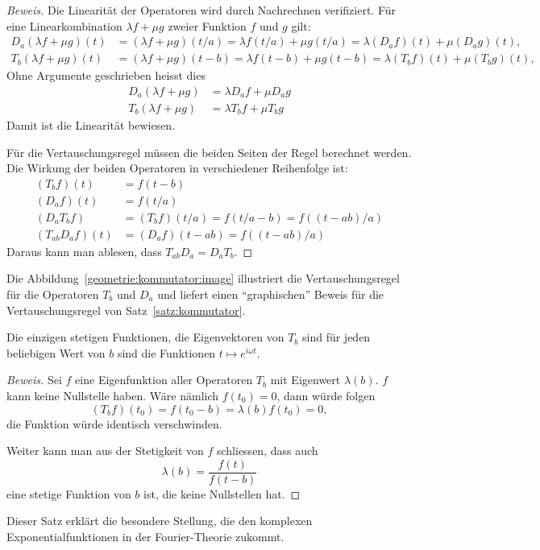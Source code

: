 \begin{proof}[Beweis]
Die Linearität der Operatoren wird durch Nachrechnen verifiziert.
Für eine Linearkombination $\lambda f+\mu g$ zweier Funktion $f$ und $g$ gilt:
\begin{align*}
D_a(\lambda f+\mu g)(t)
&=
(\lambda f+\mu g)(t/a)
=
\lambda f(t/a)+\mu g(t/a)
=
\lambda (D_af)(t)+\mu (D_ag)(t),
\\
T_b(\lambda f+ \mu g)(t)
&=
(\lambda f+\mu g)(t-b)
=
\lambda f(t-b)+\mu g(t-b)
=
\lambda (T_bf)(t)+\mu (T_bg)(t),
\end{align*}
Ohne Argumente geschrieben heisst dies
\begin{align*}
D_a(\lambda f+\mu g) &= \lambda D_af + \mu D_ag
\\
T_b(\lambda f+\mu g) &= \lambda T_bf + \mu T_bg
\end{align*}
Damit ist die Linearität bewiesen.

Für die Vertauschungsregel müssen die beiden Seiten der Regel
berechnet werden.
Die Wirkung der beiden Operatoren in verschiedener Reihenfolge
ist:
\begin{align*}
(T_bf)(t)
&=
f(t-b)
\\
(D_af)(t)
&=
f(t/a)
\\
(D_aT_bf)
&=
(T_bf)(t/a)
=
f(t/a-b)
=
f((t-ab)/a)
\\
(T_{ab}D_a f)(t)
&=
(D_af)(t - ab)
=
f((t-ab)/a)
\end{align*}
Daraus kann man ablesen, dass $T_{ab}D_a=D_aT_b$.
\end{proof}

Die Abbildung~\ref{geometrie:kommutator:image} illustriert die
Vertauschungsregel für die Operatoren $T_b$ und $D_a$ und liefert
einen ``graphischen'' Beweis für die Vertauschungsregel von
Satz~\ref{satz:kommutator}.

\begin{satz}
Die einzigen stetigen Funktionen, die Eigenvektoren von $T_b$ sind für
jeden beliebigen Wert von $b$ sind die Funktionen $t\mapsto e^{i\omega t}$.
\end{satz}

\begin{proof}[Beweis]
Sei $f$ eine Eigenfunktion aller Operatoren $T_b$ mit Eigenwert $\lambda(b)$.
$f$ kann keine Nullstelle haben.
Wäre nämlich $f(t_0)=0$, dann würde folgen
\[
(T_bf)(t_0) = f(t_0-b) = \lambda(b) f(t_0) = 0,
\]
die Funktion würde identisch verschwinden.

Weiter kann man aus der Stetigkeit von $f$ schliessen, dass auch
\[
\lambda(b) = \frac{f(t)}{f(t-b)}
\]
eine stetige Funktion von $b$ ist, die keine Nullstellen hat.
\end{proof}

Dieser Satz erklärt die besondere Stellung, die den komplexen
Exponentialfunktionen in der Fourier-Theorie zukommt.
